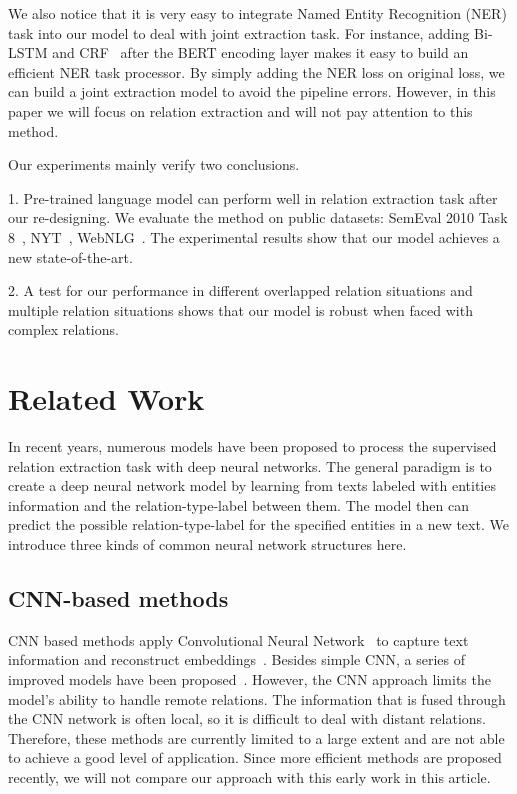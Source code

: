\documentclass[11pt,a4paper]{article}
\begin{document}
We also notice that it is very easy to integrate Named Entity Recognition (NER) task into our model to deal with joint extraction task. For instance, adding Bi-LSTM and CRF~\cite{huang2015bidirectional} after the BERT encoding layer makes it easy to build an efficient NER task processor. By simply adding the NER loss on original loss, we can build a joint extraction model to avoid the pipeline errors. However, in this paper we will focus on relation extraction and will not pay attention to this method.

Our experiments mainly verify two conclusions.

1. Pre-trained language model can perform well in relation extraction task after our re-designing. We evaluate the method on  public datasets: SemEval 2010 Task 8~\cite{hendrickx2009semeval}, NYT~\cite{riedel2010modeling}, WebNLG~\cite{gardent2017creating}. The experimental results show that our model achieves a new state-of-the-art.

2. A test for our performance in different overlapped relation situations and multiple relation situations shows that our model is robust when faced with complex relations. 



\section{Related Work}
In recent years, numerous models have been proposed to process the supervised relation extraction task with deep neural networks. The general paradigm is to create a deep neural network model by learning from texts labeled with entities information and the relation-type-label between them. The model then can predict the possible relation-type-label for the specified entities in a new text. We introduce three kinds of common neural network structures here.

\subsection{CNN-based methods} CNN based methods apply Convolutional Neural Network~\cite{lecun1998gradient} to capture text information and reconstruct embeddings~\cite{liu2013convolution}. Besides simple CNN, a series of improved models have been proposed~\cite{liu2013convolution,zeng2014relation,nguyen2015relation,lin2016neural,jiang2016relation}. However, the CNN approach limits the model's ability to handle remote relations. The information that is fused through the CNN network is often local, so it is difficult to deal with distant relations. Therefore, these methods are currently limited to a large extent and are not able to achieve a good level of application. Since more efficient methods are proposed recently, we will not compare our approach with this early work in this article.
\end{document}

